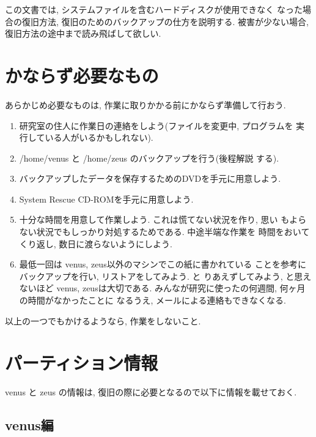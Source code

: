 \documentclass{jarticle}
\begin{document}
この文書では, システムファイルを含むハードディスクが使用できなく
なった場合の復旧方法, 復旧のためのバックアップの仕方を説明する.
被害が少ない場合, 復旧方法の途中まで読み飛ばして欲しい.

\section{かならず必要なもの}

あらかじめ必要なものは, 作業に取りかかる前にかならず準備して行おう.

\begin{enumerate}
\item 研究室の住人に作業日の連絡をしよう(ファイルを変更中, プログラムを
      実行している人がいるかもしれない).
\item /home/venus と /home/zeus のバックアップを行う(後程解説
      する).
\item バックアップしたデータを保存するためのDVDを手元に用意しよう.
\item System Rescue CD-ROMを手元に用意しよう.
\item 十分な時間を用意して作業しよう. これは慌てない状況を作り, 思い
      もよらない状況でもしっかり対処するためである. 中途半端な作業を
      時間をおいてくり返し, 数日に渡らないようにしよう.

\item 最低一回は venus, zeus以外のマシンでこの紙に書かれている
      ことを参考にバックアップを行い, リストアをしてみよう. と
      りあえずしてみよう, と思えないほど venus, zeusは大切である.
      みんなが研究に使ったの何週間, 何ヶ月の時間がなかったことに
      なるうえ, メールによる連絡もできなくなる.
\end{enumerate}
以上の一つでもかけるようなら, 作業をしないこと.

\section{パーティション情報 \label{sec:prttn}}

venus と zeus の情報は, 復旧の際に必要となるので以下に情報を載せておく.

\subsection{venus編}
\end{document}
